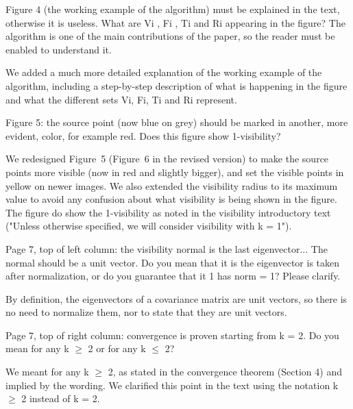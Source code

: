 \documentclass[10pt,french]{letter}
\begin{document}
  \begin{remark}
    Figure 4 (the working example of the algorithm) must be explained in the text, otherwise it is
    useless. What are Vi , Fi , Ti and Ri appearing in the figure? The algorithm is one of the main
    contributions of the paper, so the reader must be enabled to understand it.
  \end{remark}
  \begin{response}
    We added a much more detailed explanation of the working example of the algorithm, including a
    step-by-step description of what is happening in the figure and what the different sets Vi, Fi,
    Ti and Ri represent.
  \end{response}

  \begin{remark}
    Figure 5: the source point (now blue on grey) should be marked in another, more evident, color,
    for example red. Does this figure show 1-visibility?
  \end{remark}
  \begin{response}
    We redesigned Figure~5 (Figure~6 in the revised version) to make the source points more visible
    (now in red and slightly bigger), and set the visible points in yellow on newer images. We also
    extended the visibility radius to its maximum value to avoid any confusion about what visibility
    is being shown in the figure. The figure do show the 1-visibility as noted in the visibility
    introductory text ("Unless otherwise specified, we will consider visibility with k = 1").
  \end{response}

  \begin{remark}
    Page 7, top of left column: the visibility normal is the last eigenvector... The normal should be
    a unit vector. Do you mean that it is the eigenvector is taken after normalization, or do you
    guarantee that it 1 has norm = 1? Please clarify.
  \end{remark}
  \begin{response}
    By definition, the eigenvectors of a covariance matrix are unit vectors, so there is no need to
    normalize them, nor to state that they are unit vectors.
  \end{response}

  \begin{remark}
    Page 7, top of right column: convergence is proven starting from k = 2. Do you mean for any
    k $\geq$ 2 or for any k $\leq$ 2?
  \end{remark}
  \begin{response}
    We meant for any k $\geq$ 2, as stated in the convergence theorem (Section 4) and implied
    by the wording. We clarified this point in the text using the notation k $\geq$ 2 instead of k = 2.
  \end{response}
\end{document}
